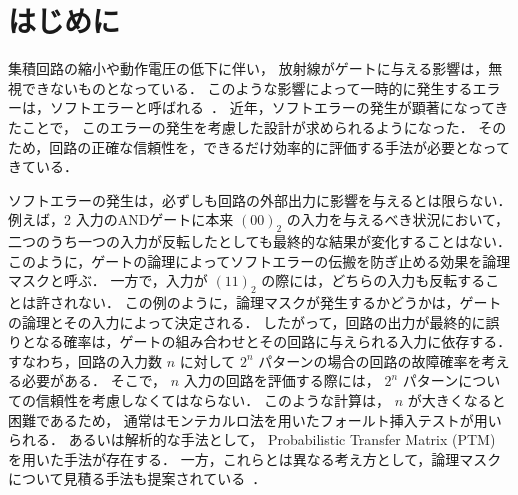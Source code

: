 \chapter{はじめに}\label{sec:introduction}

集積回路の縮小や動作電圧の低下に伴い，
放射線がゲートに与える影響は，無視できないものとなっている．
このような影響によって一時的に発生するエラーは，ソフトエラーと呼ばれる~\cite{Baumann:2005:SEA:1069593.1069707}．
近年，ソフトエラーの発生が顕著になってきたことで，
このエラーの発生を考慮した設計が求められるようになった．
そのため，回路の正確な信頼性を，できるだけ効率的に評価する手法が必要となってきている．

ソフトエラーの発生は，必ずしも回路の外部出力に影響を与えるとは限らない．
例えば，2 入力のANDゲートに本来 $(00)_2$ の入力を与えるべき状況において，
二つのうち一つの入力が反転したとしても最終的な結果が変化することはない．
このように，ゲートの論理によってソフトエラーの伝搬を防ぎ止める効果を論理マスクと呼ぶ．
一方で，入力が $(11)_2$ の際には，どちらの入力も反転することは許されない．
この例のように，論理マスクが発生するかどうかは，ゲートの論理とその入力によって決定される．
したがって，回路の出力が最終的に誤りとなる確率は，ゲートの組み合わせとその回路に与えられる入力に依存する．
すなわち，回路の入力数 $n$ に対して $2^n$ パターンの場合の回路の故障確率を考える必要がある．
そこで， $n$ 入力の回路を評価する際には，
$2^n$ パターンについての信頼性を考慮しなくてはならない．
このような計算は， $n$ が大きくなると困難であるため，
通常はモンテカルロ法を用いたフォールト挿入テストが用いられる．
あるいは解析的な手法として，
Probabilistic Transfer Matrix (PTM)~\cite{Krishnaswamy:2008:PTM:1297666.1297674}
を用いた手法が存在する．
一方，これらとは異なる考え方として，論理マスクについて見積る手法も提案されている~\cite{松永裕介:2008-09-29}．

